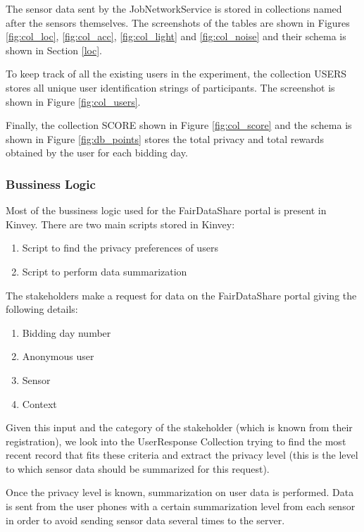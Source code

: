The sensor data sent by the JobNetworkService is stored in collections named after the sensors themselves. The screenshots of the tables
are shown in Figures \ref{fig:col_loc}, \ref{fig:col_acc}, \ref{fig:col_light} and \ref{fig:col_noise} and their schema is shown in Section \ref{loc}.

To keep track of all the existing users in the experiment, the collection USERS stores all unique user identification strings of participants.
The screenshot is shown in Figure \ref{fig:col_users}.

Finally, the collection SCORE shown in Figure \ref{fig:col_score} and the schema is shown in Figure \ref{fig:db_points} stores the total privacy and total rewards obtained by the user for each bidding day.

\subsubsection{Bussiness Logic} \label{bl}
Most of the bussiness logic used for the FairDataShare portal is present in Kinvey. There are two main scripts stored in Kinvey:

\begin{enumerate}
    \item Script to find the privacy preferences of users
    \item Script to perform data summarization
\end{enumerate}

The stakeholders make a request for data on the FairDataShare portal giving the following details:

\begin{enumerate}
    \item Bidding day number
    \item Anonymous user
    \item Sensor
    \item Context
\end{enumerate}

Given this input and the category of the stakeholder (which is known from their registration), we look into the UserResponse Collection trying to find the most recent record that
fits these criteria and extract the privacy level (this is the level to which sensor data should be summarized for this request).

Once the privacy level is known, summarization on user data is performed. Data is sent from the user phones with a certain summarization level from each sensor in order to avoid sending sensor data several times to the server. 


